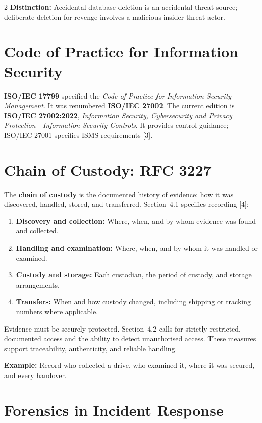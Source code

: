 \documentclass[11pt,a4paper]{article}
\begin{document}
\begin{multicols}{2}
\textbf{Distinction:} Accidental database deletion is an
accidental threat source; deliberate deletion for revenge
involves a malicious insider threat actor.

\section{Code of Practice for Information Security}

\textbf{ISO/IEC 17799} specified the \textit{Code of Practice
for Information Security Management}. It was renumbered
\textbf{ISO/IEC 27002}. The current edition is
\textbf{ISO/IEC 27002:2022}, \textit{Information Security,
Cybersecurity and Privacy Protection---Information Security
Controls}. It provides control guidance; ISO/IEC 27001
specifies ISMS requirements [3].

\columnbreak

\section{Chain of Custody: RFC 3227}

The \textbf{chain of custody} is the documented history of
evidence: how it was discovered, handled, stored, and
transferred. Section~4.1 specifies recording [4]:
\begin{enumerate}
\item \textbf{Discovery and collection:} Where, when,
and by whom evidence was found and collected.
\item \textbf{Handling and examination:} Where, when,
and by whom it was handled or examined.
\item \textbf{Custody and storage:} Each custodian,
the period of custody, and storage arrangements.
\item \textbf{Transfers:} When and how custody changed,
including shipping or tracking numbers where applicable.
\end{enumerate}

Evidence must be securely protected. Section~4.2 calls for
strictly restricted, documented access and the ability to
detect unauthorised access. These measures support
traceability, authenticity, and reliable handling.

\textbf{Example:} Record who collected a drive, who examined
it, where it was secured, and every handover.

\section{Forensics in Incident Response}


\end{multicols}
\end{document}
